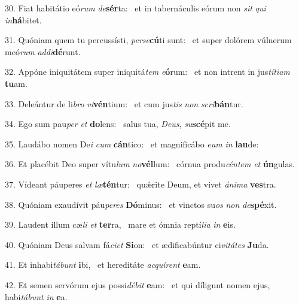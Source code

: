 30. Fiat habitátio eó\textit{rum} \textit{de}\textbf{sér}ta: \ast\  et in tabernáculis eórum non \textit{sit} \textit{qui} \textit{in}\textbf{há}bitet.\

31. Quóniam quem tu percussísti, \textit{per}\textit{se}\textbf{cú}ti sunt: \ast\  et super dolórem vúlnerum meó\textit{rum} \textit{ad}\textit{di}\textbf{dé}runt.\

32. Appóne iniquitátem super iniquitá\textit{tem} \textit{e}\textbf{ó}rum: \ast\  et non intrent in jus\textit{tí}\textit{ti}\textit{am} \textbf{tu}am.\

33. Deleántur de li\textit{bro} \textit{vi}\textbf{vén}tium: \ast\  et cum jus\textit{tis} \textit{non} \textit{scri}\textbf{bán}tur.\

34. Ego sum pau\textit{per} \textit{et} \textbf{do}lens: \ast\  salus tua, \textit{De}\textit{us}, \textit{su}\textbf{scé}pit me.\

35. Laudábo nomen De\textit{i} \textit{cum} \textbf{cán}tico: \ast\  et magnificábo \textit{e}\textit{um} \textit{in} \textbf{lau}de:\

36. Et placébit Deo super vítu\textit{lum} \textit{no}\textbf{vél}lum: \ast\  córnua produ\textit{cén}\textit{tem} \textit{et} \textbf{ún}gulas.\

37. Vídeant páuperes \textit{et} \textit{læ}\textbf{tén}tur: \ast\  quǽrite Deum, et vivet \textit{á}\textit{ni}\textit{ma} \textbf{ves}tra.\

38. Quóniam exaudívit páu\textit{pe}\textit{res} \textbf{Dó}minus: \ast\  et vinctos su\textit{os} \textit{non} \textit{de}\textbf{spé}xit.\

39. Laudent illum cæ\textit{li} \textit{et} \textbf{ter}ra, \ast\  mare et ómnia reptí\textit{li}\textit{a} \textit{in} \textbf{e}is.\

40. Quóniam Deus salvam fá\textit{ci}\textit{et} \textbf{Si}on: \ast\  et ædificabúntur ci\textit{vi}\textit{tá}\textit{tes} \textbf{Ju}da.\

41. Et inhabi\textit{tá}\textit{bunt} \textbf{i}bi, \ast\  et hereditáte \textit{ac}\textit{quí}\textit{rent} \textbf{e}am.\

42. Et semen servórum ejus possi\textit{dé}\textit{bit} \textbf{e}am: \ast\  et qui díligunt nomen ejus, habi\textit{tá}\textit{bunt} \textit{in} \textbf{e}a.\

